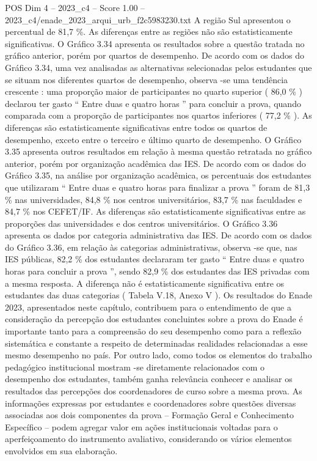 \begin{textsample}{POS Dim 4 – 2023\_c4 – Score 1.00 – 2023\_c4/enade\_2023\_arqui\_urb\_f2c5983230.txt}
A região Sul apresentou o percentual de 81,7 \%.
As diferenças entre as regiões não são estatisticamente significativas.
O Gráfico 3.34 apresenta os resultados sobre a questão tratada no gráfico anterior, porém por quartos de desempenho.
De acordo com os dados do Gráfico 3.34, uma vez analisadas as alternativas selecionadas pelos estudantes que se situam nos diferentes quartos de desempenho, observa -se uma tendência crescente : uma proporção maior de participantes no quarto superior ( 86,0 \% ) declarou ter gasto “ Entre duas e quatro horas ” para concluir a prova, quando comparada com a proporção de participantes nos quartos inferiores ( 77,2 \% ).
As diferenças são estatisticamente significativas entre todos os quartos de desempenho, exceto entre o terceiro e último quarto de desempenho.
O Gráfico 3.35 apresenta outros resultados em relação à mesma questão retratada no gráfico anterior, porém por organização acadêmica das IES.
De acordo com os dados do Gráfico 3.35, na análise por organização acadêmica, os percentuais dos estudantes que utilizaram “ Entre duas e quatro horas para finalizar a prova ” foram de 81,3 \% nas universidades, 84,8 \% nos centros universitários, 83,7 \% nas faculdades e 84,7 \% nos CEFET/IF.
As diferenças são estatisticamente significativas entre as proporções das universidades e dos centros universitários.
O Gráfico 3.36 apresenta os dados por categoria administrativa das IES.
De acordo com os dados do Gráfico 3.36, em relação às categorias administrativas, observa -se que, nas IES públicas, 82,2 \% dos estudantes declararam ter gasto “ Entre duas e quatro horas para concluir a prova ”, sendo 82,9 \% dos estudantes das IES privadas com a mesma resposta.
A diferença não é estatisticamente significativa entre os estudantes das duas categorias ( Tabela V.18, Anexo V ).
Os resultados do Enade 2023, apresentados neste capítulo, contribuem para o entendimento de que a consideração da percepção dos estudantes concluintes sobre a prova do Enade é importante tanto para a compreensão do seu desempenho como para a reflexão sistemática e constante a respeito de determinadas realidades relacionadas a esse mesmo desempenho no país.
Por outro lado, como todos os elementos do trabalho pedagógico institucional mostram -se diretamente relacionados com o desempenho dos estudantes, também ganha relevância conhecer e analisar os resultados das percepções dos coordenadores de curso sobre a mesma prova.
As informações expressas por estudantes e coordenadores sobre questões diversas associadas aos dois componentes da prova – Formação Geral e Conhecimento Específico – podem agregar valor em ações institucionais voltadas para o aperfeiçoamento do instrumento avaliativo, considerando os vários elementos envolvidos em sua elaboração.

\end{textsample}
